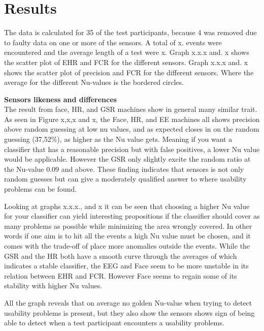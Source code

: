 \section{Results}
The data is calculated for 35 of the test participants, because 4 was removed due to faulty data on one or more of the sensors.	
A total of x. events were encountered and the average length of a test were x.
Graph x.x.x and. x shows the scatter plot of EHR and FCR for the different sensors. 
Graph x.x.x and. x shows the scatter plot of precision and FCR for the different sensors. Where the average for the different Nu-values is the bordered circles.


\textbf{Sensors likeness and differences}\\
The result from face, HR, and GSR machines show in general many similar trait.
As seen in Figure x,x,x and x, the Face, HR, and EE machines all shows precision above random guessing at low nu values, and as expected closes in on the random guessing (37,52\%), as higher as the Nu value gets. Meaning if you want a classifier that has a reasonable precision but with false positives, a lower Nu value would be applicable. However the GSR only slightly excite the random ratio at the Nu-value 0.09 and above.
These finding indicates that sensors is not only random guesses but can give a moderately qualified answer to where usability problems can be found.

Looking at graphs x.x.x., and x it can be seen that choosing a higher Nu value for your classifier can yield interesting propositions if the classifier should cover as many problems as possible while minimizing the area wrongly covered.
In other words if one aim is to hit all the events a high Nu value must be chosen, and it comes with the trade-off of place more anomalies outside the events. 
While the GSR and the HR both have a smooth curve through the averages of which indicates a stable classifier, the EEG and Face seem to be more unstable in its relation between EHR and FCR. However Face seems to regain some of its stability with higher Nu values.

All the graph reveals that on average no golden Nu-value when trying to detect usability problems is present, but they also show the sensors shows sign of being able to detect when a test participant encounters a usability problems.

